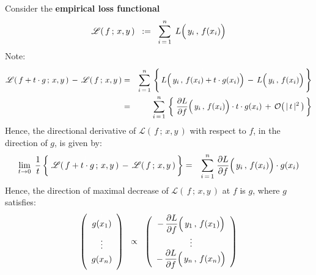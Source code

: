 \noindent
Consider the \textbf{empirical loss functional}
\begin{equation*}
\mathscr{L}(\,f\,;\,x,y\,)
\;\; := \;\;
	\overset{n}{\underset{i\,=\,1}{\sum}}\;\,
	L\!\left(\,y_{i}\,,\,\overset{{\color{white}.}}{f(x_{i})}\right)
\end{equation*}
Note:
\begin{eqnarray*}
\mathscr{L}(\,f + t \cdot g\,;\,x,y\,)
\,-\,
\mathscr{L}(\,f \,;\,x,y\,)
& = &
	\overset{n}{\underset{i\,=\,1}{\sum}}\,
	\left\{\,
		\overset{{\color{white}1}}{L\!\left(\,y_{i}\,,\,\overset{{\color{white}.}}{f(x_{i}) + t \cdot g(x_{i})}\right)}
		\, - \,
		L\!\left(\,y_{i}\,,\,\overset{{\color{white}.}}{f(x_{i})}\right)
		\,\right\}
\\
& = &
	\overset{n}{\underset{i\,=\,1}{\sum}}\,
	\left\{\;
		\dfrac{\partial L}{\partial f}\!\left(\,y_{i}\,,\,\overset{{\color{white}.}}{f(x_{i})}\right) \cdot t \cdot g(x_{i})
		\, + \,
		\mathcal{O}\!\left(\,\vert\,t\,\vert^{2}\,\right)
		\,\right\}
\end{eqnarray*}
Hence, the directional derivative of $\mathscr{L}(\,f\,;\,x,y\,)$
with respect to $f$, in the direction of $g$, is given by:
\begin{eqnarray*}
\underset{t \rightarrow 0}{\lim}\;\,
\dfrac{1}{t}
\left\{\;
	\overset{{\color{white}1}}{\mathscr{L}(\,f + t \cdot g\,;\,x,y\,)}
	\,-\,
	\mathscr{L}(\,f \,;\,x,y\,)
	\,\right\}
& = &
	\overset{n}{\underset{i\,=\,1}{\sum}}\;
	\dfrac{\partial L}{\partial f}\!\left(\,y_{i}\,,\,\overset{{\color{white}.}}{f(x_{i})}\right) \cdot g(x_{i})
\end{eqnarray*}
Hence, the direction of maximal decrease of $\mathscr{L}(\,f\,;\,x,y\,)$ at $f$ is $g$, where $g$ satisfies:
\begin{equation*}
\left(%
\begin{array}{c}
	\overset{{\color{white}1}}{g(x_{1})}
	\\
	\underset{{\color{white}1}}{\overset{{\color{white}1}}{\vdots}}
	\\
	\underset{{\color{white}1}}{g(x_{n})}
	\end{array}\right)
\;\; \propto \;\;
	\left(\begin{array}{c}
		-\, \dfrac{\partial L}{\partial f}\!\left(\,y_{1}\,,\,\overset{{\color{white}.}}{f(x_{1})}\right)
		\\
		\vdots
		\\
		-\, \dfrac{\partial L}{\partial f}\!\left(\,y_{n}\,,\,\overset{{\color{white}.}}{f(x_{n})}\right)
		\end{array}\right)
\end{equation*}

